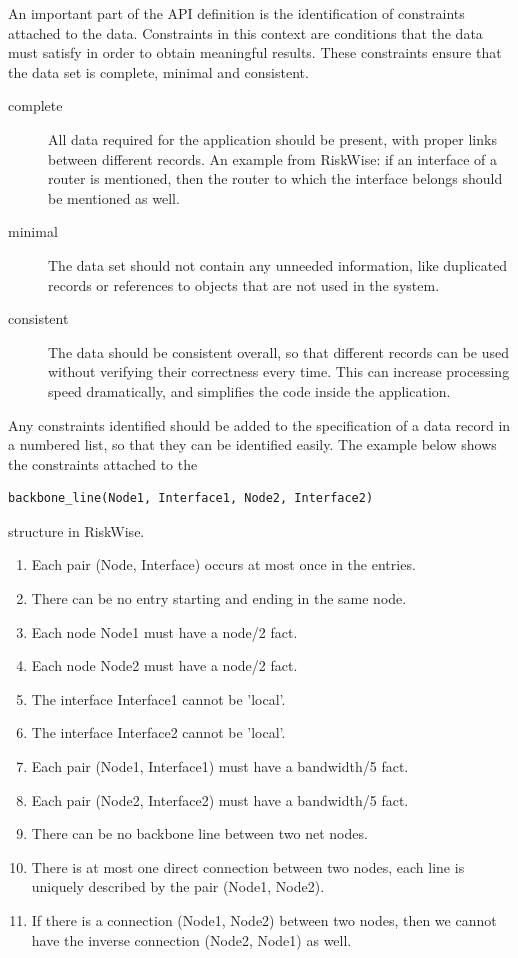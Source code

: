 \documentclass[a4paper,12pt]{report}
\begin{document}
An important part of the API definition is the identification of constraints attached to the data. Constraints in this context are conditions that the data must satisfy in order to obtain meaningful results. These constraints ensure that the data set is complete, minimal and consistent. 
\begin{description}
\item[complete] All data required for the application should be present, with proper links between different records. An example from RiskWise: if an interface of a router is mentioned, then the router to which the interface belongs should be mentioned as well.

\item[minimal] The data set should not contain any unneeded information, like duplicated records or references to objects that are not used in the system. 

\item[consistent] The data should be consistent overall, so that different records can be used without verifying their correctness every time. This can increase processing speed dramatically, and simplifies the code inside the application.
\end{description}
Any constraints identified should be added to the specification of a data record in a numbered list, so that they can be identified easily. The example below shows the constraints attached to the 
\begin{verbatim}backbone_line(Node1, Interface1, Node2, Interface2)
\end{verbatim}
structure in RiskWise.

\begin{enumerate}
\item Each pair (Node, Interface) occurs at most once in the entries. 
\item There can be no entry starting and ending in the same node. 
\item Each node Node1 must have a node/2 fact. 
\item Each node Node2 must have a node/2 fact. 
\item The interface Interface1 cannot be 'local'. 
\item The interface Interface2 cannot be 'local'. 
\item Each pair (Node1, Interface1) must have a bandwidth/5 fact. 
\item Each pair (Node2, Interface2) must have a bandwidth/5 fact. 
\item There can be no backbone line between two net nodes. 
\item There is at most one direct connection between two nodes, each line is uniquely described by the pair (Node1, Node2). 
\item If there is a connection (Node1, Node2) between two nodes, then we cannot have the inverse connection (Node2, Node1) as well. 
\end{enumerate}
\end{document}
